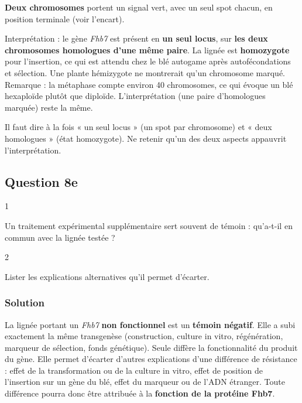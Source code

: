 \documentclass[11pt,a4paper]{article}
\begin{document}
\textbf{Deux chromosomes} portent un signal vert, avec un seul spot chacun, en position terminale (voir l'encart).

Interprétation : le gène \emph{Fhb7} est présent en \textbf{un seul locus}, sur \textbf{les deux chromosomes homologues d'une même paire}. La lignée est \textbf{homozygote} pour l'insertion, ce qui est attendu chez le blé autogame après autofécondations et sélection. Une plante hémizygote ne montrerait qu'un chromosome marqué. Remarque : la métaphase compte environ 40 chromosomes, ce qui évoque un blé hexaploïde plutôt que diploïde. L'interprétation (une paire d'homologues marquée) reste la même.

\begin{piege}

Il faut dire à la fois « un seul locus » (un spot par chromosome) et « deux homologues » (état homozygote). Ne retenir qu'un des deux aspects appauvrit l'interprétation.

\end{piege}

\hypertarget{question-8e}{%
\subsection{Question 8e}\label{question-8e}}

\begin{indication}{1}

Un traitement expérimental supplémentaire sert souvent de témoin : qu'a-t-il en commun avec la lignée testée ?

\end{indication}

\begin{indication}{2}

Lister les explications alternatives qu'il permet d'écarter.

\end{indication}

\hypertarget{solution-24}{%
\subsubsection{Solution}\label{solution-24}}

La lignée portant un \emph{Fhb7} \textbf{non fonctionnel} est un \textbf{témoin négatif}. Elle a subi exactement la même transgenèse (construction, culture in vitro, régénération, marqueur de sélection, fonds génétique). Seule diffère la fonctionnalité du produit du gène. Elle permet d'écarter d'autres explications d'une différence de résistance : effet de la transformation ou de la culture in vitro, effet de position de l'insertion sur un gène du blé, effet du marqueur ou de l'ADN étranger. Toute différence pourra donc être attribuée à la \textbf{fonction de la protéine Fhb7}.
\end{document}
